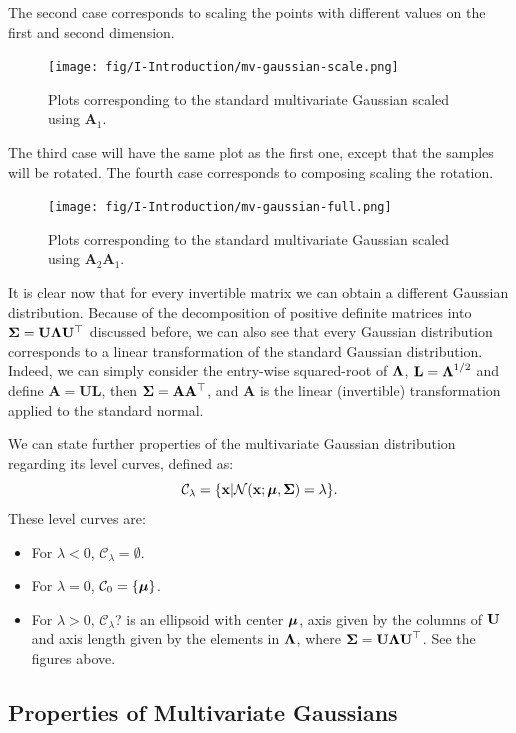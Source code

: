 The second case corresponds to scaling the points with different values on the first and second dimension.
\begin{figure}[H]
 \centering
 \texttt{[image: fig/I-Introduction/mv-gaussian-scale.png]}
 \caption{Plots corresponding to the standard multivariate Gaussian scaled using $\mathbf{A}_1$.}
\end{figure}

The third case will have the same plot as the first one, except that the samples will be rotated. The fourth case corresponds to composing scaling the rotation.
\begin{figure}[H]
 \centering
 \texttt{[image: fig/I-Introduction/mv-gaussian-full.png]}
 \caption{Plots corresponding to the standard multivariate Gaussian scaled using $\mathbf{A}_2\mathbf{A}_1$.}
\end{figure}

It is clear now that for every invertible matrix we can obtain a different Gaussian distribution. Because of the decomposition of positive definite matrices into $\boldsymbol{\mathbf{\Sigma}}=\mathbf{U}\boldsymbol{\mathbf{\Lambda}}\mathbf{U}^\top$ discussed before, we can also see that every Gaussian distribution corresponds to a linear transformation of the standard Gaussian distribution. Indeed, we can simply consider the entry-wise squared-root of $\boldsymbol{\mathbf{\Lambda}}$, $\mathbf{L}=\boldsymbol{\mathbf{\Lambda}}^{1/2}$ and define $\mathbf{A}=\mathbf{U}\mathbf{L}$, then $\boldsymbol{\mathbf{\Sigma}}=\mathbf{A}\mathbf{A}^\top$, and $\mathbf{A}$ is the linear (invertible) transformation applied to the standard normal.

We can state further properties of the multivariate Gaussian distribution regarding its level curves, defined as:
\begin{equation}
\mathcal{C}_\lambda = \{\boldsymbol{\mathbf{x}}|\mathcal{N}(\boldsymbol{\mathbf{x}};\boldsymbol{\mathbf{\mu}},\boldsymbol{\mathbf{\Sigma}})=\lambda\}. 
\end{equation}
These level curves are:
\begin{itemize}
    \item For $\lambda<0$, $\mathcal{C}_\lambda = \emptyset$.
    \item For $\lambda=0$, $\mathcal{C}_0=\{\boldsymbol{\mathbf{\mu}}\}$.
    \item For $\lambda>0$, $\mathcal{C}_\lambda$? is an ellipsoid with center $\boldsymbol{\mathbf{\mu}}$, axis given by the columns of $\boldsymbol{\mathbf{U}}$ and axis length given by the elements in $\boldsymbol{\mathbf{\Lambda}}$, where $\boldsymbol{\mathbf{\Sigma}}=\boldsymbol{\mathbf{U}}\boldsymbol{\mathbf{\Lambda}}\boldsymbol{\mathbf{U}}^\top$. See the figures above.
\end{itemize}

\subsection{Properties of Multivariate Gaussians}

